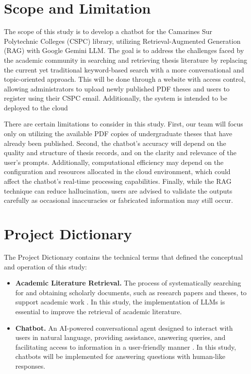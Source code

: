 \begin{refsection}
\newpage
\clearpage
\section{Scope and Limitation}

The scope of this study is to develop a chatbot for the Camarines Sur Polytechnic Colleges (CSPC) library, utilizing Retrieval-Augmented Generation (RAG) with Google Gemini LLM. The goal is to address the challenges faced by the academic community in searching and retrieving thesis literature by replacing the current yet traditional keyword-based search with a more conversational and topic-oriented approach. This will be done through a website with access control, allowing administrators to upload newly published PDF theses and users to register using their CSPC email. Additionally, the system is intended to be deployed to the cloud

\bigbreak
There are certain limitations to consider in this study. First, our team will focus only on utilizing the available PDF copies of undergraduate theses that have already been published. Second, the chatbot’s accuracy will depend on the quality and structure of thesis records, and on the clarity and relevance of the user's prompts. Additionally, computational efficiency may depend on the configuration and resources allocated in the cloud environment, which could affect the chatbot’s real-time processing capabilities. Finally, while the RAG technique can reduce hallucination, users are advised to validate the outputs carefully as occasional inaccuracies or fabricated information may still occur. 

\section{Project Dictionary}

The Project Dictionary contains the technical terms that defined the conceptual and operation of this study:

\begin{itemize}

    \item \textbf{Academic Literature Retrieval.} The process of systematically searching for and obtaining scholarly documents, such as research papers and theses, to support academic work \cite{sallam2023chatgpt}. In this study, the implementation of LLMs is essential to improve the retrieval of academic literature.

    \item \textbf{Chatbot.} An AI-powered conversational agent designed to interact with users in natural language, providing assistance, answering queries, and facilitating access to information in a user-friendly manner \cite{chow2023developing}. In this study, chatbots will be implemented for answering questions with human-like responses.


\end{itemize}
\end{refsection}
